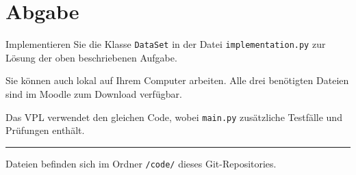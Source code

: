 \documentclass[a4paper,12pt]{article}
\begin{document}
\section{Abgabe}
Implementieren Sie die Klasse \texttt{DataSet} in der Datei \texttt{implementation.py} zur Lösung der oben beschriebenen Aufgabe.

Sie können auch lokal auf Ihrem Computer arbeiten. Alle drei benötigten Dateien sind im Moodle zum Download verfügbar.

Das VPL verwendet den gleichen Code, wobei \texttt{main.py} zusätzliche Testfälle und Prüfungen enthält.

\hrule
\vspace{1cm}
\footnotesize{Dateien befinden sich im Ordner \texttt{/code/} dieses Git-Repositories.}
\end{document}
